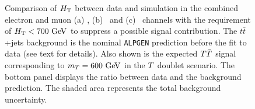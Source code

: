 \begin{figure}[h!tb]\begin{center}
	\caption{Comparison of $\HT$ between data and simulation in the combined
electron and muon (a) \chii, (b) \chiii\ and (c) \chiv\ channels with 
the requirement of $\HT<700\gev$ to suppress a possible signal contribution.
The $t\bar{t}$+jets background is the nominal \texttt{ALPGEN} prediction before the fit to data (see text for details).
Also shown is the expected $\TT$ signal corresponding to $m_{\T}=600\gev$ in the $\T$ doublet scenario.
The bottom panel displays the ratio between data
and the background prediction. The shaded area represents the total background uncertainty.\label{fig:HT_beforefit}}
\end{center}\end{figure}

